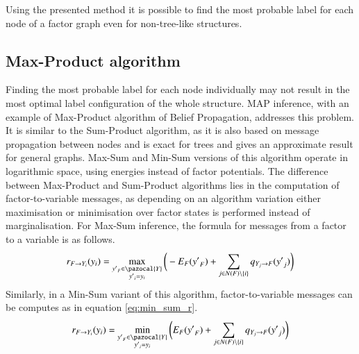 Using the presented method it is possible to find the most probable label for each node of a factor graph even for non-tree-like structures. 

\subsection{Max-Product algorithm }

Finding the most probable label for each node individually may not result in the most optimal label configuration of the whole structure. MAP inference, with an example of Max-Product algorithm of Belief Propagation, addresses this problem. It is similar to the Sum-Product algorithm, as it is also based on message propagation between nodes and is exact for trees and gives an approximate result for general graphs. Max-Sum and Min-Sum versions of this algorithm operate in logarithmic space, using energies instead of factor potentials. The difference between Max-Product and Sum-Product algorithms lies in the computation of factor-to-variable messages, as depending on an algorithm variation either maximisation or minimisation over factor states is performed instead of marginalisation. For Max-Sum inference, the formula for messages from a factor to a variable is as follows.
\begin{equation}
   r_{F \rightarrow Y_i}(y_i) = 
       \max_{\substack{{y'}_{F}\in \pazocal{Y}                               \\ {y'}_i = y_i}}
       {\bigg(-E_F({y'}_F) + \sum_{j \in N (F) \setminus \left \{ i \right \}}
            {q_{Y_j\rightarrow F}({y'}_j)}\bigg)}
\end{equation}
Similarly, in a Min-Sum variant of this algorithm, factor-to-variable messages can be computes as in equation \ref{eq:min_sum_r}.
\begin{equation}
    \label{eq:min_sum_r}
   r_{F \rightarrow Y_i}(y_i) = 
       \min_{\substack{{y'}_{F}\in \pazocal{Y}                               \\ {y'}_i = y_i}}
       {\bigg(E_F({y'}_F) + \sum_{j \in N (F) \setminus \left \{ i \right \}}
            {q_{Y_j\rightarrow F}({y'}_j)}\bigg)}
\end{equation}

